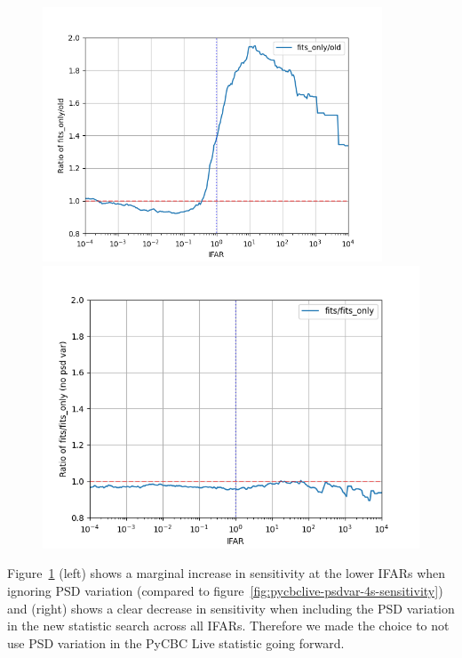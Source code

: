 \begin{figure}
  \centering
  \begin{minipage}[t]{0.9\linewidth}
  
    \includegraphics[width=0.9\textwidth]{images/pycbclive/fo_vs_o.png}
    
    \includegraphics[width=0.9\linewidth]{images/pycbclive/f_vs_fo.png}

  \end{minipage}
  \caption{}
  \label{fig:pycbclive-sensitivity-comparisons}
\end{figure}
%
Figure~\ref{fig:pycbclive-sensitivity-comparisons} (left) shows a marginal increase in sensitivity at the lower IFARs when ignoring PSD variation (compared to figure~\ref{fig:pycbclive-psdvar-4s-sensitivity}) and (right) shows a clear decrease in sensitivity when including the PSD variation in the new statistic search across all IFARs. Therefore we made the choice to not use PSD variation in the PyCBC Live statistic going forward.

